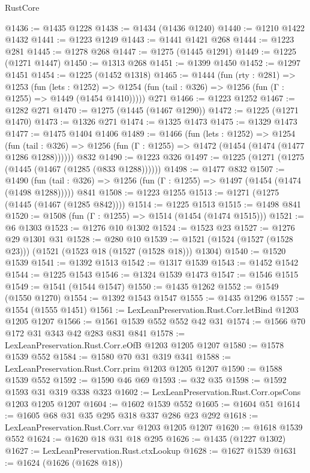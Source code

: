 \begin{lexlean}{RustCore}
\begin{coremodule}
@1436 := @1435 @1228
@1438 := @1434 (@1436 @1240)
@1440 := @1210 @1422 @1432
@1441 := @1223 @1249
@1443 := @1441 @1421 @268
@1444 := @1223 @281
@1445 := @1278 @268
@1447 := @1275 (@1445 @1291)
@1449 := @1225 (@1271 @1447)
@1450 := @1313 @268
@1451 := @1399 @1450
@1452 := @1297 @1451
@1454 := @1225 (@1452 @1318)
@1465 := @1444
    (fun (rty : @281) =>
    @1253
      (fun (lets : @1252) =>
      @1254 (fun (tail : @326) => @1256 (fun (Γ : @1255) => @1449 (@1454 @1410)))))
    @271
@1466 := @1223 @1252
@1467 := @1282 @271
@1470 := @1275 (@1445 (@1467 @1290))
@1472 := @1225 (@1271 @1470)
@1473 := @1326 @271
@1474 := @1325 @1473
@1475 := @1329 @1473
@1477 := @1475 @1404 @1406
@1489 := @1466
    (fun (lets : @1252) =>
    @1254
      (fun (tail : @326) => @1256 (fun (Γ : @1255) => @1472 (@1454 (@1474 (@1477 @1286 @1288))))))
    @832
@1490 := @1223 @326
@1497 := @1225 (@1271 (@1275 (@1445 (@1467 (@1285 (@833 @1288))))))
@1498 := @1477 @832
@1507 := @1490
    (fun (tail : @326) => @1256 (fun (Γ : @1255) => @1497 (@1454 (@1474 (@1498 @1288)))))
    @841
@1508 := @1223 @1255
@1513 := @1271 (@1275 (@1445 (@1467 (@1285 @842))))
@1514 := @1225 @1513
@1515 := @1498 @841
@1520 := @1508 (fun (Γ : @1255) => @1514 (@1454 (@1474 @1515)))
@1521 := @6 @1303
@1523 := @1276 @10 @1302
@1524 := @1523 @23
@1527 := @1276 @29 @1301 @31
@1528 := @280 @10
@1539 := @1521 (@1524 (@1527 (@1528 @23))) (@1521 (@1523 @18 (@1527 (@1528 @18))) @1304)
@1540 := @1520 @1539
@1541 := @1392 @1513
@1542 := @1317 @1539
@1543 := @1452 @1542
@1544 := @1225 @1543
@1546 := @1324 @1539 @1473
@1547 := @1546 @1515
@1549 := @1541 (@1544 @1547)
@1550 := @1435 @1262
@1552 := @1549 (@1550 @1270)
@1554 := @1392 @1543 @1547
@1555 := @1435 @1296
@1557 := @1554 (@1555 @1451)
@1561 := LexLeanPreservation.Rust.Corr.letBind @1203 @1205 @1207
@1566 := @1561 @1539 @552 @552 @42 @31
@1574 := @1566 @70 @172 @31 @343 @42 @283 @831 @841
@1578 := LexLeanPreservation.Rust.Corr.eOfB @1203 @1205 @1207
@1580 := @1578 @1539 @552
@1584 := @1580 @70 @31 @319 @341
@1588 := LexLeanPreservation.Rust.Corr.prim @1203 @1205 @1207
@1590 := @1588 @1539 @552
@1592 := @1590 @46 @69
@1593 := @32 @35
@1598 := @1592 @1593 @31 @319 @338 @323
@1602 := LexLeanPreservation.Rust.Corr.opsCons @1203 @1205 @1207
@1604 := @1602 @1539 @552
@1605 := @1604 @51
@1614 := @1605 @68 @31 @35 @295 @318 @337 @286 @23 @292
@1618 := LexLeanPreservation.Rust.Corr.var @1203 @1205 @1207
@1620 := @1618 @1539 @552
@1624 := @1620 @18 @31 @18 @295
@1626 := @1435 (@1227 @1302)
@1627 := LexLeanPreservation.Rust.ctxLookup
@1628 := @1627 @1539
@1631 := @1624 (@1626 (@1628 @18))

\end{coremodule}
\end{lexlean}
